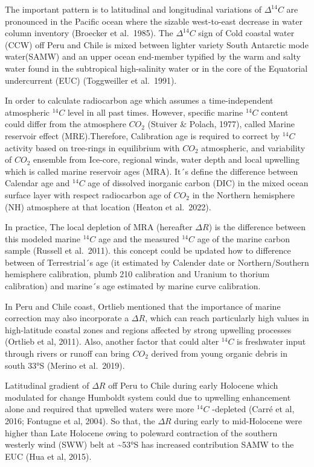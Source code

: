 \documentclass[
]{article}
\begin{document}
The important pattern is to latitudinal and longitudinal variations of
\(\Delta^{14}C\) are pronounced in the Pacific ocean where the sizable
west-to-east decrease in water column inventory (Broecker et al.~1985).
The \(\Delta^{14}C\) sign of Cold coastal water (CCW) off Peru and Chile
is mixed between lighter variety South Antarctic mode water(SAMW) and an
upper ocean end-member typified by the warm and salty water found in the
subtropical high-salinity water or in the core of the Equatorial
undercurrent (EUC) (Toggweiller et al.~1991).

In order to calculate radiocarbon age which assumes a time-independent
atmospheric \(^{14}C\) level in all past times. However, specific marine
\(^{14}C\) content could differ from the atmosphere \(CO_2\) (Stuiver \&
Polach, 1977), called Marine reservoir effect (MRE).Therefore,
Calibration age is required to correct by \(^{14}C\) activity based on
tree-rings in equilibrium with \(CO_2\) atmospheric, and variability of
\(CO_2\) ensemble from Ice-core, regional winds, water depth and local
upwelling which is called marine reservoir ages (MRA). It´s define the
difference between Calendar age and \(^{14}C\) age of dissolved
inorganic carbon (DIC) in the mixed ocean surface layer with respect
radiocarbon age of \(CO_2\) in the Northern hemisphere (NH) atmosphere
at that location (Heaton et al.~2022).

In practice, The local depletion of MRA (hereafter \(\Delta R\)) is the
difference between this modeled marine \(^{14}C\) age and the measured
\(^{14}C\) age of the marine carbon sample (Russell et al.~2011). this
concept could be updated how to difference between of Terrestrial´s age
(it estimated by Calender date or Northern/Southern hemisphere
calibration, plumb 210 calibration and Uranium to thorium calibration)
and marine´s age estimated by marine curve calibration.

In Peru and Chile coast, Ortlieb mentioned that the importance of marine
correction may also incorporate a \(\Delta R\), which can reach
particularly high values in high-latitude coastal zones and regions
affected by strong upwelling processes (Ortlieb et al, 2011). Also,
another factor that could alter \(^{14}C\) is freshwater input through
rivers or runoff can bring \(CO_2\) derived from young organic debris in
south 33°S (Merino et al.~2019).

Latitudinal gradient of \(\Delta R\) off Peru to Chile during early
Holocene which modulated for change Humboldt system could due to
upwelling enhancement alone and required that upwelled waters were more
\(^{14}C\) -depleted (Carré et al, 2016; Fontugne et al, 2004). So that,
the \(\Delta R\) during early to mid-Holocene were higher than Late
Holocene owing to poleward contraction of the southern westerly wind
(SWW) belt at \textasciitilde53°S has increased contribution SAMW to the
EUC (Hua et al, 2015).
\end{document}
